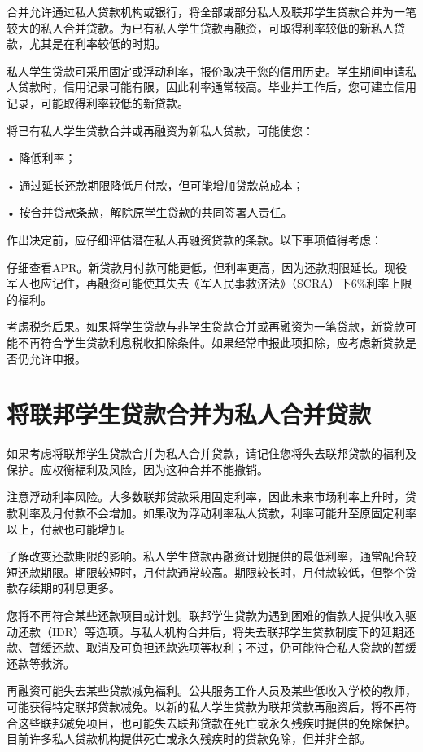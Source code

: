 \documentclass[UTF8,fontset=none,11pt,a4paper]{ctexart}
\begin{document}
合并允许通过私人贷款机构或银行，将全部或部分私人及联邦学生贷款合并为一笔较大的私人合并贷款。为已有私人学生贷款再融资，可取得利率较低的新私人贷款，尤其是在利率较低的时期。


私人学生贷款可采用固定或浮动利率，报价取决于您的信用历史。学生期间申请私人贷款时，信用记录可能有限，因此利率通常较高。毕业并工作后，您可建立信用记录，可能取得利率较低的新贷款。


将已有私人学生贷款合并或再融资为新私人贷款，可能使您：


• 降低利率；


• 通过延长还款期限降低月付款，但可能增加贷款总成本；


• 按合并贷款条款，解除原学生贷款的共同签署人责任。


作出决定前，应仔细评估潜在私人再融资贷款的条款。以下事项值得考虑：


仔细查看APR。新贷款月付款可能更低，但利率更高，因为还款期限延长。现役军人也应记住，再融资可能使其失去《军人民事救济法》（SCRA）下6\%利率上限的福利。


考虑税务后果。如果将学生贷款与非学生贷款合并或再融资为一笔贷款，新贷款可能不再符合学生贷款利息税收扣除条件。如果经常申报此项扣除，应考虑新贷款是否仍允许申报。


\section*{将联邦学生贷款合并为私人合并贷款}
如果考虑将联邦学生贷款合并为私人合并贷款，请记住您将失去联邦贷款的福利及保护。应权衡福利及风险，因为这种合并不能撤销。


注意浮动利率风险。大多数联邦贷款采用固定利率，因此未来市场利率上升时，贷款利率及月付款不会增加。如果改为浮动利率私人贷款，利率可能升至原固定利率以上，付款也可能增加。


了解改变还款期限的影响。私人学生贷款再融资计划提供的最低利率，通常配合较短还款期限。期限较短时，月付款通常较高。期限较长时，月付款较低，但整个贷款存续期的利息更多。


您将不再符合某些还款项目或计划。联邦学生贷款为遇到困难的借款人提供收入驱动还款（IDR）等选项。与私人机构合并后，将失去联邦学生贷款制度下的延期还款、暂缓还款、取消及可负担还款选项等权利；不过，仍可能符合私人贷款的暂缓还款等救济。


再融资可能失去某些贷款减免福利。公共服务工作人员及某些低收入学校的教师，可能获得特定联邦贷款减免。以新的私人学生贷款为联邦贷款再融资后，将不再符合这些联邦减免项目，也可能失去联邦贷款在死亡或永久残疾时提供的免除保护。目前许多私人贷款机构提供死亡或永久残疾时的贷款免除，但并非全部。
\end{document}

